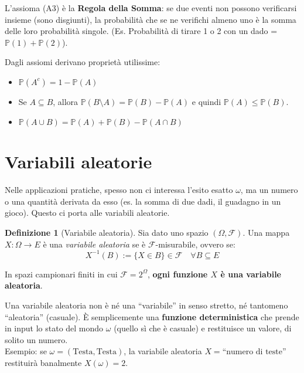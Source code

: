 \documentclass[11pt, a4paper]{report}
\theoremstyle{plain}
\theoremstyle{definition}
\newtheorem{definition}[theorem]{Definizione}
\theoremstyle{remark}
\newcommand{\PP}{\mathbb{P}}
\newcommand{\F}{\mathcal{F}}
\newcommand{\1}{\mathbf{1}}
\begin{document}
\begin{hint}[{Additività}]
    L'assioma (A3) è la \textbf{Regola della Somma}: se due eventi non possono verificarsi insieme (sono disgiunti), la probabilità che se ne verifichi almeno uno è la somma delle loro probabilità singole. (Es. Probabilità di tirare 1 o 2 con un dado = $\PP(1) + \PP(2)$).
\end{hint}

Dagli assiomi derivano proprietà utilissime:
\begin{itemize}
    \item $\PP(A^c) = 1 - \PP(A)$
    \item Se $A \subseteq B$, allora $\PP(B \setminus A) = \PP(B) - \PP(A)$ e quindi $\PP(A) \le \PP(B)$.
    \item $\PP(A \cup B) = \PP(A) + \PP(B) - \PP(A \cap B)$
\end{itemize}

\section{Variabili aleatorie}

Nelle applicazioni pratiche, spesso non ci interessa l'esito esatto $\omega$, ma un numero o una quantità derivata da esso (es. la somma di due dadi, il guadagno in un gioco). Questo ci porta alle variabili aleatorie.

\begin{definition}[Variabile aleatoria]
Sia dato uno spazio $(\Omega, \F)$. Una mappa $X : \Omega \to E$ è una \emph{variabile aleatoria} se è $\F$-misurabile, ovvero se:
\[ X^{-1}(B) := \{X \in B\} \in \F \quad \forall B \subseteq E \]
\end{definition}

In spazi campionari finiti in cui $\F = 2^\Omega$, \textbf{ogni funzione $X$ è una variabile aleatoria}.

\begin{spiegazione}
    Una variabile aleatoria non è né una ``variabile'' in senso stretto, né tantomeno ``aleatoria'' (casuale). È semplicemente una \textbf{funzione deterministica} che prende in input lo stato del mondo $\omega$ (quello sì che è casuale) e restituisce un valore, di solito un numero. \\
    Esempio: se $\omega = (\text{Testa}, \text{Testa})$, la variabile aleatoria $X = \text{``numero di teste''}$ restituirà banalmente $X(\omega) = 2$.
\end{spiegazione}
\end{document}
